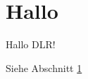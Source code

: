 \documentclass[12pt,ngerman]{scrartcl}
\begin{document}
\section{Hallo} \label{dlr}
Hallo DLR! 


Siehe Abschnitt \ref{dlr}
\end{document}
